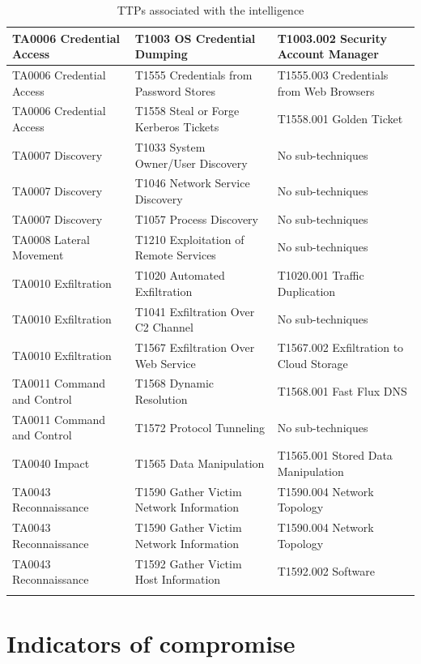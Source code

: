 \begin{center}
\begin{longtable}[H]{|C{0.3\textwidth}|C{0.3\textwidth}|C{0.3\textwidth}|}
TA0006 Credential Access & T1003 OS Credential Dumping & T1003.002 Security Account Manager \\ \hline
TA0006 Credential Access & T1555 Credentials from Password Stores & T1555.003 Credentials from Web Browsers \\ \hline
TA0006 Credential Access & T1558 Steal or Forge Kerberos Tickets & T1558.001 Golden Ticket \\ \hline
TA0007 Discovery & T1033 System Owner/User Discovery & No sub-techniques \\ \hline
TA0007 Discovery & T1046 Network Service Discovery & No sub-techniques \\ \hline
TA0007 Discovery & T1057 Process Discovery & No sub-techniques \\ \hline
TA0008 Lateral Movement & T1210 Exploitation of Remote Services & No sub-techniques \\ \hline
TA0010 Exfiltration & T1020 Automated Exfiltration & T1020.001 Traffic Duplication \\ \hline
TA0010 Exfiltration & T1041 Exfiltration Over C2 Channel & No sub-techniques \\ \hline
TA0010 Exfiltration & T1567 Exfiltration Over Web Service & T1567.002 Exfiltration to Cloud Storage \\ \hline
TA0011 Command and Control & T1568 Dynamic Resolution & T1568.001 Fast Flux DNS \\ \hline
TA0011 Command and Control & T1572 Protocol Tunneling & No sub-techniques \\ \hline
TA0040 Impact & T1565 Data Manipulation & T1565.001 Stored Data Manipulation \\ \hline
TA0043 Reconnaissance & T1590 Gather Victim Network Information & T1590.004 Network Topology \\ \hline
TA0043 Reconnaissance & T1590 Gather Victim Network Information & T1590.004 Network Topology \\ \hline
TA0043 Reconnaissance & T1592 Gather Victim Host Information & T1592.002 Software \\ \hline
\caption{TTPs associated with the intelligence}
\end{longtable}
\end{center}
\normalsize

\section{Indicators of compromise}

